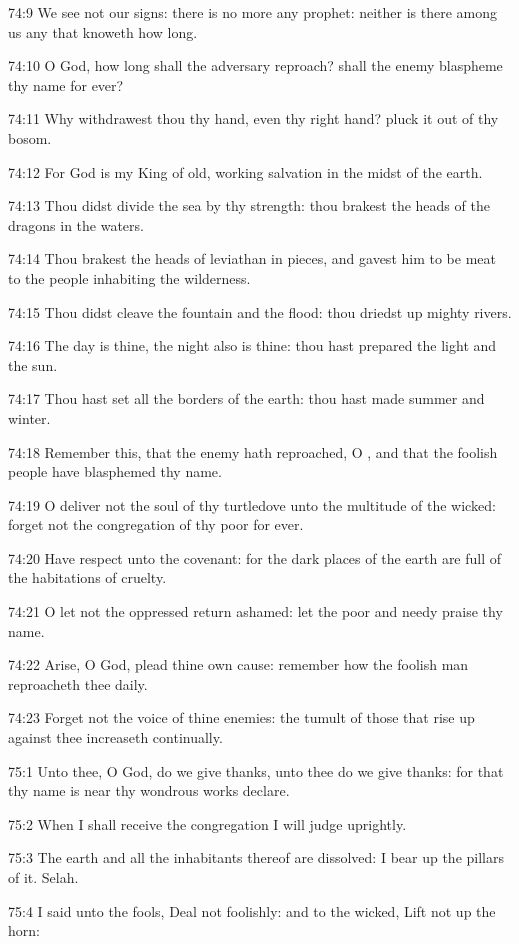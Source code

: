 74:9 We see not our signs: there is no more any prophet: neither is
there among us any that knoweth how long.

74:10 O God, how long shall the adversary reproach? shall the enemy
blaspheme thy name for ever?

74:11 Why withdrawest thou thy hand, even thy right hand? pluck it out
of thy bosom.

74:12 For God is my King of old, working salvation in the midst of the
earth.

74:13 Thou didst divide the sea by thy strength: thou brakest the
heads of the dragons in the waters.

74:14 Thou brakest the heads of leviathan in pieces, and gavest him to
be meat to the people inhabiting the wilderness.

74:15 Thou didst cleave the fountain and the flood: thou driedst up
mighty rivers.

74:16 The day is thine, the night also is thine: thou hast prepared
the light and the sun.

74:17 Thou hast set all the borders of the earth: thou hast made
summer and winter.

74:18 Remember this, that the enemy hath reproached, O \LORD, and that
the foolish people have blasphemed thy name.

74:19 O deliver not the soul of thy turtledove unto the multitude of
the wicked: forget not the congregation of thy poor for ever.

74:20 Have respect unto the covenant: for the dark places of the earth
are full of the habitations of cruelty.

74:21 O let not the oppressed return ashamed: let the poor and needy
praise thy name.

74:22 Arise, O God, plead thine own cause: remember how the foolish
man reproacheth thee daily.

74:23 Forget not the voice of thine enemies: the tumult of those that
rise up against thee increaseth continually.



75:1 Unto thee, O God, do we give thanks, unto thee do we give thanks:
for that thy name is near thy wondrous works declare.

75:2 When I shall receive the congregation I will judge uprightly.

75:3 The earth and all the inhabitants thereof are dissolved: I bear
up the pillars of it. Selah.

75:4 I said unto the fools, Deal not foolishly: and to the wicked,
Lift not up the horn:

